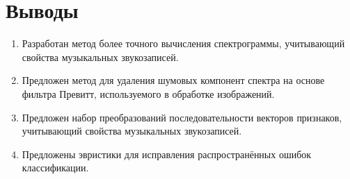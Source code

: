 \section{Выводы}

\begin{enumerate}
  \item Разработан метод более точного вычисления спектрограммы, учитывающий
  свойства музыкальных звукозаписей.
  \item Предложен метод для удаления шумовых компонент спектра на основе фильтра
  Превитт, используемого в обработке изображений.
  \item Предложен набор преобразований последовательности векторов признаков,
  учитывающий свойства музыкальных звукозаписей.
  \item Предложены эвристики для исправления распространённых ошибок
  классификации.
\end{enumerate}


\clearpage